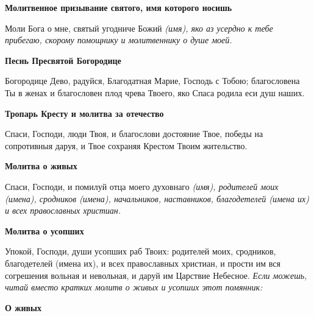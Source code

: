 \medskip
\bfseries Молитвенное призывание святого, имя которого носишь\normalfont{}\nopagebreak


Моли Бога о мне, святый угодниче Божий \itshape (имя)\normalfont{}, яко аз усердно к тебе прибегаю, скорому помощнику и молитвеннику о душе моей. 


\medskip
\bfseries Песнь Пресвятой Богородице\normalfont{}\nopagebreak


Богородице Дево, радуйся, Благодатная Марие, Господь с Тобою; благословена Ты в женах и благословен плод чрева Твоего, яко Спаса родила еси душ наших. 


\medskip
\bfseries Тропарь Кресту и молитва за отечество


\normalfont{}Спаси, Господи, люди Твоя, и благослови достояние Твое, победы на сопротивныя даруя, и Твое сохраняя Крестом Твоим жительство.


\medskip
\bfseries Молитва о живых


\normalfont{}Спаси, Господи, и помилуй отца моего духовнаго \itshape (имя)\normalfont{}, родителей моих \itshape (имена)\normalfont{}, сродников \itshape (имена)\normalfont{}, начальников, наставников, благодетелей \itshape (имена их)\normalfont{} и всех православных христиан.


\medskip
\bfseries Молитва о усопших\normalfont{}\nopagebreak


Упокой, Господи, души усопших раб Твоих: родителей моих, сродников, благодетелей (имена их), и всех православных христиан, и прости им вся согрешения вольная и невольная, и даруй им Царствие Небесное. 
\itshape Если можешь, читай вместо кратких молитв о живых и усопших этот помянник:\normalfont{}


\medskip
\bfseries О живых


